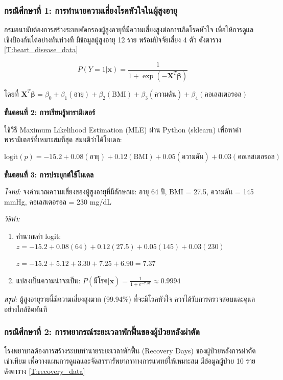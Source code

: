 \subsubsection{กรณีศึกษาที่ 1: การทำนายความเสี่ยงโรคหัวใจในผู้สูงอายุ}
กรมอนามัยต้องการสร้างระบบคัดกรองผู้สูงอายุที่มีความเสี่ยงสูงต่อการเกิดโรคหัวใจ เพื่อให้การดูแลเชิงป้องกันได้อย่างทันท่วงที มีข้อมูลผู้สูงอายุ 12 ราย พร้อมปัจจัยเสี่ยง 4 ตัว ดังตาราง \ref{T:heart_disease_data}

$$P(Y=1|\mathbf{x}) = \frac{1}{1 + \exp(-\mathbf{X}^T\boldsymbol{\beta})}$$

\noindent
โดยที่ $\mathbf{X}^T\boldsymbol{\beta} = \beta_0 + \beta_1(\text{อายุ}) + \beta_2(\text{BMI}) + \beta_3(\text{ความดัน}) + \beta_4(\text{คอเลสเตอรอล})$

\textbf{ขั้นตอนที่ 2: การเรียนรู้พารามิเตอร์}

ใช้วิธี Maximum Likelihood Estimation (MLE) ผ่าน Python (sklearn) เพื่อหาค่าพารามิเตอร์ที่เหมาะสมที่สุด สมมติว่าได้โมเดล:

$$\text{logit}(p) = -15.2 + 0.08(\text{อายุ}) + 0.12(\text{BMI}) + 0.05(\text{ความดัน}) + 0.03(\text{คอเลสเตอรอล})$$

\textbf{ขั้นตอนที่ 3: การประยุกต์ใช้โมเดล}

\textit{โจทย์:} จงคำนวณความเสี่ยงของผู้สูงอายุที่มีลักษณะ: อายุ 64 ปี, BMI = 27.5, ความดัน = 145 mmHg, คอเลสเตอรอล = 230 mg/dL

\textit{วิธีทำ:}
\begin{enumerate}
	\item คำนวณค่า logit: $z = -15.2 + 0.08(64) + 0.12(27.5) + 0.05(145) + 0.03(230)$

	$z = -15.2 + 5.12 + 3.30 + 7.25 + 6.90 = 7.37$

	\item แปลงเป็นความน่าจะเป็น: $P(\text{มีโรค}|\mathbf{x}) = \frac{1}{1 + e^{-7.37}} \approx 0.9994$
\end{enumerate}

\textit{สรุป:} ผู้สูงอายุรายนี้มีความเสี่ยงสูงมาก (99.94\%) ที่จะมีโรคหัวใจ ควรได้รับการตรวจสอบและดูแลอย่างใกล้ชิดทันที

\subsubsection{กรณีศึกษาที่ 2: การพยากรณ์ระยะเวลาพักฟื้นของผู้ป่วยหลังผ่าตัด}
โรงพยาบาลต้องการสร้างระบบทำนายระยะเวลาพักฟื้น (Recovery Days) ของผู้ป่วยหลังการผ่าตัดเข่าเทียม เพื่อวางแผนการดูแลและจัดสรรทรัพยากรทางการแพทย์ให้เหมาะสม มีข้อมูลผู้ป่วย 10 ราย ดังตาราง \ref{T:recovery_data}

